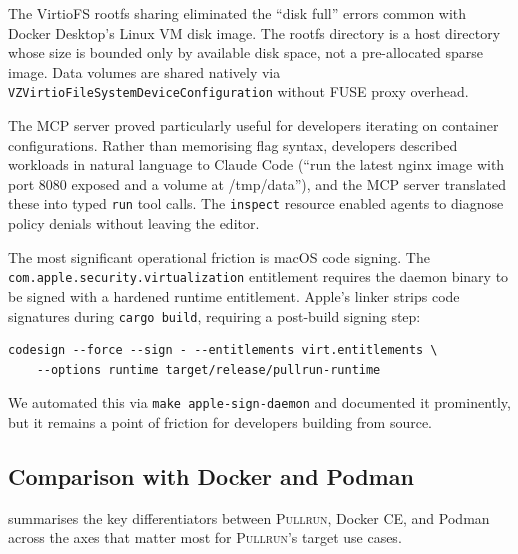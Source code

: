 \documentclass[11pt,a4paper]{article}
\newcommand{\pullrun}{\textsc{Pullrun}}
\begin{document}
The VirtioFS rootfs sharing eliminated the ``disk full'' errors common with Docker Desktop's Linux VM disk image. The rootfs directory is a host directory whose size is bounded only by available disk space, not a pre-allocated sparse image. Data volumes are shared natively via \texttt{VZVirtioFileSystemDeviceConfiguration} without FUSE proxy overhead.

The MCP server proved particularly useful for developers iterating on container configurations. Rather than memorising flag syntax, developers described workloads in natural language to Claude Code (``run the latest nginx image with port 8080 exposed and a volume at /tmp/data''), and the MCP server translated these into typed \texttt{run} tool calls. The \texttt{inspect} resource enabled agents to diagnose policy denials without leaving the editor.

The most significant operational friction is macOS code signing. The \texttt{com.apple.security.virtualization} entitlement requires the daemon binary to be signed with a hardened runtime entitlement. Apple's linker strips code signatures during \texttt{cargo build}, requiring a post-build signing step:

\begin{verbatim}
codesign --force --sign - --entitlements virt.entitlements \
    --options runtime target/release/pullrun-runtime
\end{verbatim}

We automated this via \texttt{make apple-sign-daemon} and documented it prominently, but it remains a point of friction for developers building from source.

\subsection{Comparison with Docker and Podman}

 summarises the key differentiators between \pullrun{}, Docker CE, and Podman across the axes that matter most for \pullrun{}'s target use cases.
\end{document}
